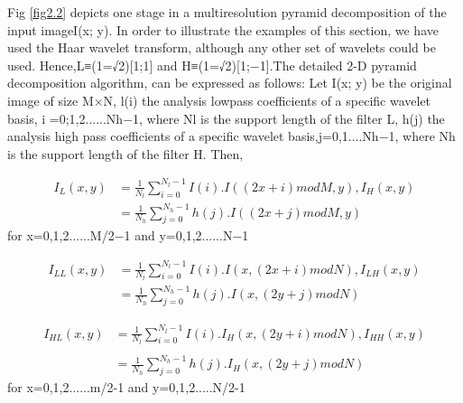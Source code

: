 Fig \ref{fig2.2} depicts one stage in a multiresolution pyramid decomposition of the input imageI(x; y). In order to illustrate the
examples of this section, we have used the Haar wavelet
transform, although any other set of wavelets could be used.
Hence,L≡(1=√2)[1;1] and H≡(1=√2)[1;−1].The detailed 2-D pyramid decomposition algorithm, can be expressed as follows: Let I(x; y) be the original image of size M×N, l(i) the analysis lowpass coefficients of a specific wavelet basis, i =0;1,2......Nh−1, where Nl is the support length of the filter L, h(j) the analysis high pass coefficients of a specific wavelet basis,j=0,1....Nh−1, where Nh is the support length of the filter H. Then,

\begin{equation}
    \begin{split}
     {I}_{L}\left(x,y \right) &=\frac{1}{{N}_{l}} \sum_{i=0}^{{N}_{l}-1} I\left(i \right). I\left(\left(2x+i \right)modM,y \right),{I}_{H}\left(x,y \right)\\ &=\frac{1}{{N}_{h}} \sum_{j=0}^{{N}_{h}-1} h\left(j \right). I\left(\left(2x+j \right)modM,y \right) 
    \end{split}
\end{equation}
for x=0,1,2......M/2−1 and y=0,1,2......N−1

\begin{equation}
    \begin{split}
     {I}_{LL}\left(x,y \right) &=\frac{1}{{N}_{l}} \sum_{i=0}^{{N}_{l}-1} I\left(i \right). I\left(x,\left(2x+i \right)mod N \right),{I}_{LH}\left(x,y \right)
\\ &=\frac{1}{{N}_{h}} \sum_{j=0}^{{N}_{h}-1} h\left(j \right). I\left(x,\left(2y+j \right)mod N \right) 
    \end{split}
\end{equation}

\begin{equation}
    \begin{split}
    {I}_{HL}\left(x,y \right) &=\frac{1}{{N}_{l}} \sum_{i=0}^{{N}_{l}-1} I\left(i \right). {I}_{H}\left(x,\left(2y+i \right)mod N \right),{I}_{HH}\left(x,y \right) \\
\\ &=\frac{1}{{N}_{h}} \sum_{j=0}^{{N}_{h}-1} h\left(j \right). {I}_{H}\left(x,\left(2y+j \right)mod N \right)
    \end{split}
\end{equation}
for x=0,1,2......m/2-1 and y=0,1,2.....N/2-1 \\

